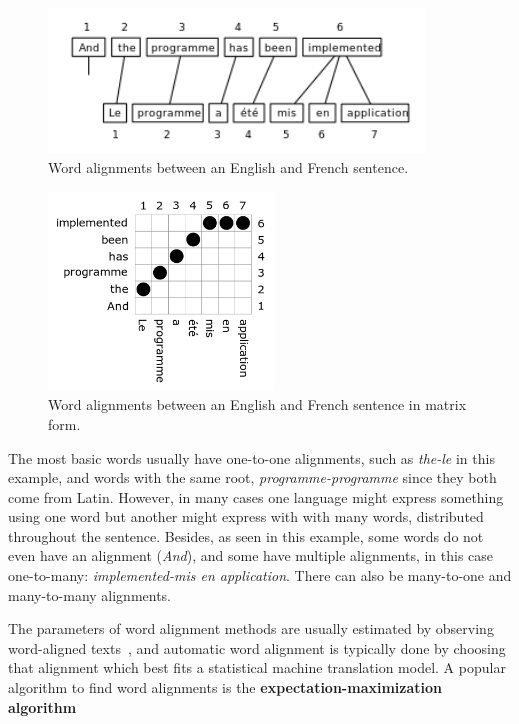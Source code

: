 \begin{figure}[!ht]
    \centering
    \includegraphics[width=10cm]{figures/word_align.png}
    \caption{Word alignments between an English and French sentence.}
\end{figure}

\begin{figure}[!ht]
    \centering
    \includegraphics[width=6cm]{figures/word_align_matrix.png}
    \caption{Word alignments between an English and French sentence in matrix form.}
\end{figure}

The most basic words usually have one-to-one alignments, such as \emph{the-le} in this example, and words with the same root, \emph{programme-programme} since they both come from Latin. However, in many cases one language might express something using one word but another might express with with many words, distributed throughout the sentence. Besides, as seen in this example, some words do not even have an alignment (\emph{And}), and some have multiple alignments, in this case one-to-many: \emph{implemented-mis en application}. There can also be many-to-one and many-to-many alignments.

The parameters of word alignment methods are usually estimated by observing word-aligned texts~\cite{brown1993mathematics}, and automatic word alignment is typically done by choosing that alignment which best fits a statistical machine translation model. A popular algorithm to find word alignments is the \textbf{expectation-maximization algorithm}~\cite{och1999improved}

